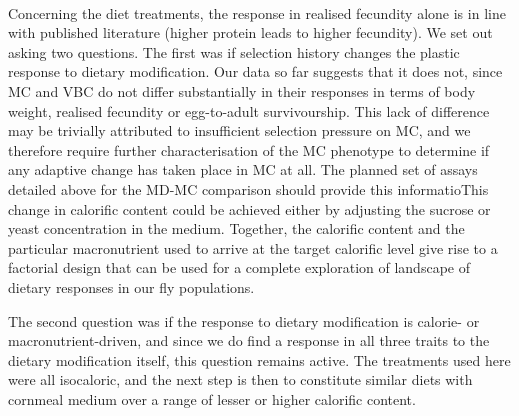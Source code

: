 \documentclass[12pt,onecolumn,twoside]{article}
\begin{document}
	\paragraph{\empty} Concerning the diet treatments, the response in realised fecundity alone is in line with published literature (higher protein leads to higher fecundity). We set out asking two questions. The first was if selection history changes the plastic response to dietary modification. Our data so far suggests that it does not, since MC and VBC do not differ substantially in their responses in terms of body weight, realised fecundity or egg-to-adult survivourship. This lack of difference may be trivially attributed to insufficient selection pressure on MC, and we therefore require further characterisation of the MC phenotype to determine if any adaptive change has taken place in MC at all. The planned set of assays detailed above for the MD-MC comparison should provide this informatioThis change in calorific content could be achieved either by adjusting the sucrose or yeast concentration in the medium. Together, the calorific content and the particular macronutrient used to arrive at the target calorific level give rise to a factorial design that can be used for a complete exploration of landscape of dietary responses in our fly populations.

	The second question was if the response to dietary modification is calorie- or macronutrient-driven, and since we do find a response in all three traits to the dietary modification itself, this question remains active. The treatments used here were all isocaloric, and the next step is then to constitute similar diets with cornmeal medium over a range of lesser or higher calorific content.
	
	
\end{document}
